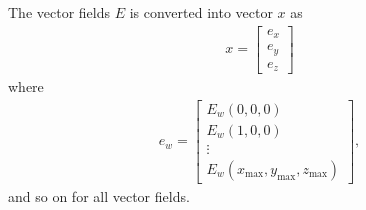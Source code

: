 \documentclass{article}
\newcommand{\E}[2]{\begin{align}#2\label{eq:#1}\end{align}}
\newcommand{\mx}{\text{max}}
\begin{document}
The vector fields $E$ is converted into vector $x$ as
\E{}{x = \begin{bmatrix} e_x \\ e_y \\ e_z \end{bmatrix}}
    where
\E{}{e_w = \begin{bmatrix} E_w(0,0,0) \\ E_w(1,0,0) \\
                        \vdots \\ E_w(x_\mx, y_\mx, z_\mx) \end{bmatrix},}
and so on for all vector fields.
\end{document}
